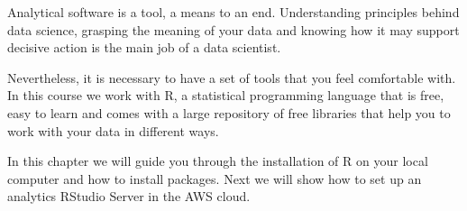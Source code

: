 Analytical software is a tool, a means to an end. Understanding principles behind data science, grasping the meaning of your data and knowing how it may support decisive action is the main job of a data scientist.

Nevertheless, it is necessary to have a set of tools that you feel comfortable with. In this course we work with R, a statistical programming language that is free, easy to learn and comes with a large repository of free libraries that help you to work with your data in different ways.

In this chapter we will guide you through the installation of R on your local computer and how to install packages. Next we will show how to set up an analytics RStudio Server in the AWS cloud.